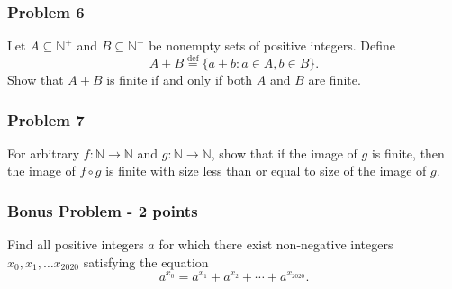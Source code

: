\newpage\documentclass[11pt,onecolumn,fleqn]{article}
\theoremstyle{definition}
\begin{document}
\subsubsection*{Problem 6} 
Let $A\subseteq\mathbb{N}^+$ and $B\subseteq\mathbb{N}^+$ be nonempty sets of positive integers.  
Define $$A + B \stackrel{\text{def}}{=} \{a+b:a\in A,b\in B\}.$$ 
Show that $A+B$ is finite if and only if both $A$ and $B$ are finite.

\subsubsection*{Problem 7}
For arbitrary $f : \mathbb{N} \rightarrow \mathbb{N}$ and $g : \mathbb{N} \rightarrow \mathbb{N}$, show that if the image of $g$ 
is finite, then the image of $f \circ g$ is finite with size less than or equal to size of the image of $g$.


\subsubsection*{Bonus Problem - 2 points}
Find all positive integers $a$ for which there exist non-negative integers $x_0, x_1,\dots x_{2020}$ satisfying the equation
$$a^{x_0} = a^{x_1} + a^{x_2} + \cdots + a^{x_{2020}}.$$
\end{document}
